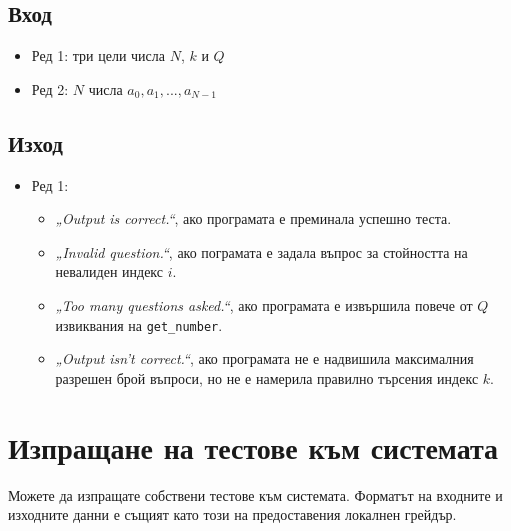 \documentclass[a4paper,11pt]{article}
\newcommand{\code}[1]{\texttt{#1}}
\newcommand{\noskip}{\vspace{-\parskip}}
\begin{document}
\noskip
\subsection*{Вход}
\noskip
\begin{itemize}
    \item Ред 1: три цели числа $N$, $k$ и $Q$
    \item Ред 2: $N$ числа $a_0, a_1, ..., a_{N-1}$
\end{itemize}
\noskip
\subsection*{Изход}
\noskip
\begin{itemize}
    \item Ред 1:
    \begin{itemize}
        \item \textit{„Output is correct.“},
            ако програмата е преминала успешно теста.
        \item \textit{„Invalid question.“},
            ако пограмата е задала въпрос за стойността на невалиден индекс $i$.
        \item \textit{„Too many questions asked.“},
            ако програмата е извършила повече от $Q$ извиквания на
            \code{get\_number}.
        \item \textit{„Output isn't correct.“},
            ако програмата не е надвишила максималния разрешен брой въпроси, но
            не е намерила правилно търсения индекс $k$.
    \end{itemize}
\end{itemize}

\section*{Изпращане на тестове към системата}
Можете да изпращате собствени тестове към системата. Форматът на входните и
изходните данни е същият като този на предоставения локалнен грейдър.
\end{document}
